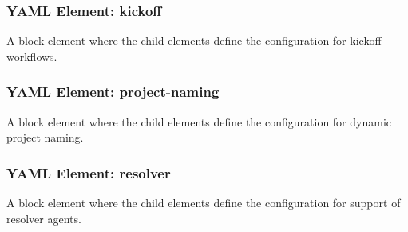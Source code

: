 \subsubsection{YAML Element: kickoff}\label{sec:yaml-moniker-kickoff}
A block element where the child elements define the configuration for kickoff workflows. 

\subsubsection{YAML Element: project-naming}\label{sec:yaml-moniker-project-naming}
A block element where the child elements define the configuration for dynamic project naming. 

\subsubsection{YAML Element: resolver}\label{sec:yaml-moniker-resolver}
A block element where the child elements define the configuration for support of resolver agents. 


